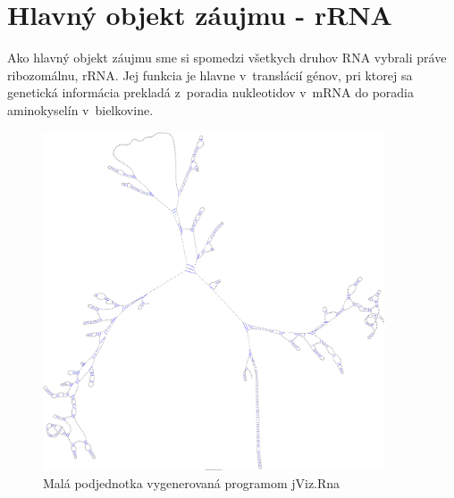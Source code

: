 \section{Hlavný objekt záujmu - rRNA}

Ako hlavný objekt záujmu sme si spomedzi všetkych druhov RNA vybrali práve ribozomálnu, rRNA.
Jej funkcia je hlavne v~translácií génov, pri ktorej sa genetická informácia prekladá
z~poradia nukleotidov v~mRNA do poradia aminokyselín v~bielkovine.

\begin{figure}[H]
  \centering
  \includegraphics[width=0.9\textwidth]{../img/human_jviz}
  \caption{Malá podjednotka vygenerovaná programom jViz.Rna }
  \label{obr:human_jviz}
\end{figure}

